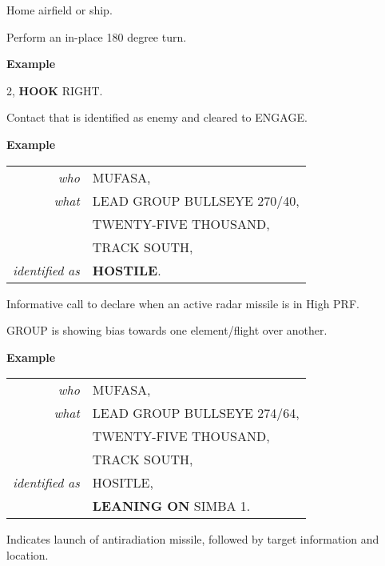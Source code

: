 \begin{tcoloritemize}
    Home airfield or ship.

    \blueitem[HOOK]
    Perform an in-place 180 degree turn.

    \medskip
    \textbf{Example}
    \begin{center}
        \begin{minipage}{0.9\textwidth}
            2, \textbf{HOOK} RIGHT.
        \end{minipage}
    \end{center}

    \blueitem[HOSTILE]
    Contact that is identified as enemy and cleared to ENGAGE.

    \medskip
    \textbf{Example}
    \begin{center}
        \begin{tabular}{>{\itshape}r l}
            who & MUFASA, \\
            what & LEAD GROUP BULLSEYE 270/40, \\
            & TWENTY-FIVE THOUSAND, \\
            & TRACK SOUTH,\\
            identified as & \textbf{HOSTILE}. \\
        \end{tabular}
    \end{center}

    \blueitem[HUSKY]
    Informative call to declare when an active radar missile is in High PRF.

    \blueitem[LEANING ON]
    GROUP is showing bias towards one element/flight over another.

    \medskip
    \textbf{Example}
    \begin{center}
        \begin{tabular}{>{\itshape}r l}
            who & MUFASA, \\
            what & LEAD GROUP BULLSEYE 274/64, \\
            & TWENTY-FIVE THOUSAND, \\
            & TRACK SOUTH,\\
            identified as & HOSITLE, \\
            & \textbf{LEANING ON} SIMBA 1. \\
        \end{tabular}
    \end{center}

    \blueitem[MAGNUM]
    Indicates launch of antiradiation missile,
    followed by target information and location.


\end{tcoloritemize}
